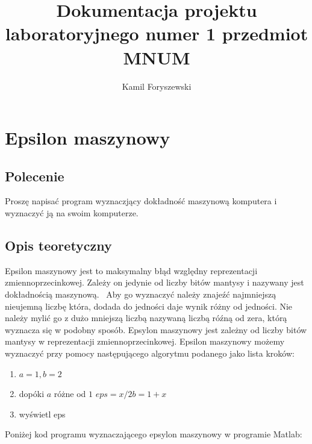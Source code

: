 \documentclass[a4paper, 11pt]{article}
\author{Kamil Foryszewski}
\title{Dokumentacja projektu laboratoryjnego numer 1 przedmiot MNUM}
\begin{document}

\maketitle
\tableofcontents


\section{Epsilon maszynowy}

\subsection{Polecenie}
Proszę napisać program wyznaczjący dokładność maszynową komputera i wyznaczyć ją na swoim komputerze.
\subsection{Opis teoretyczny}
\indent

Epsilon maszynowy jest to maksymalny błąd względny reprezentacji zmiennoprzecinkowej. Zależy on jedynie od liczby bitów mantysy i nazywany jest dokładnością maszynową.~\cite{tatj} Aby go wyznaczyć należy znajeźć najmniejszą nieujemną liczbę która, dodada do jedności daje wynik różny od jedności. Nie należy mylić go z dużo mniejszą liczbą nazywaną liczbą róźną od zera, którą wyznacza się w podobny sposób. Epsylon maszynowy jest zależny od liczby bitów mantysy w reprezentacji zmiennoprzecinkowej. Epsilon maszynowy możemy wyznaczyć przy pomocy następującego algorytmu podanego jako lista kroków:
\begin{enumerate}
  \item $a = 1, b = 2$
  \item dopóki $a$ różne od $1$ $eps = x/2 b = 1 + x$
  \item wyświetl eps
\end{enumerate} 
Poniżej kod programu wyznaczającego epsylon maszynowy w programie Matlab:
\end{document}
